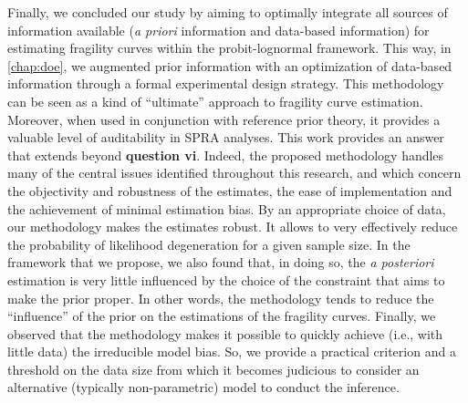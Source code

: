Finally, we concluded our study by aiming to optimally integrate all sources of information available (\emph{a priori} information and data-based information)
 for estimating fragility curves within the probit-lognormal framework. This way, in \cref{chap:doe}, we augmented prior information with an optimization of data-based information through a formal experimental design strategy. This methodology can be seen as a kind of ``ultimate'' approach to fragility curve estimation. 
 Moreover, when used in conjunction with reference prior theory, it provides a valuable level of auditability in SPRA analyses.
 This work provides an answer that extends beyond \textbf{question vi}. %
Indeed, the proposed methodology %
handles many of the central issues identified throughout this research,
and which concern the objectivity and robustness of the estimates, the ease of implementation and the achievement of minimal estimation bias. By an appropriate choice of data, our methodology makes the estimates robust. It allows to very effectively reduce the probability of likelihood degeneration for a given sample size. In the framework that we propose, we also found that, in doing so, the \emph{a posteriori} estimation is very little influenced by the choice of the constraint that aims to make the prior proper. In other words, the methodology tends to reduce the ``influence'' of the prior on the estimations of the fragility curves. %
Finally, we observed that the methodology makes it possible to quickly achieve (i.e., with little data) the irreducible model bias. So, we provide a practical criterion and a threshold on the data size from which it becomes judicious to consider an alternative (typically non-parametric) model to conduct the inference.


